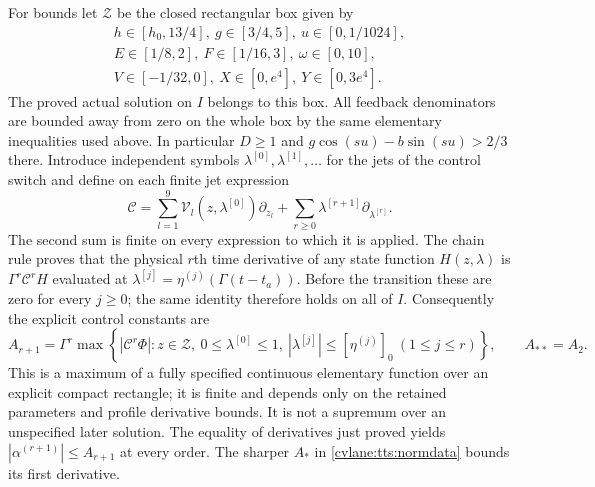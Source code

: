 For bounds let $\mathcal Z$ be the closed rectangular box given
by
\[
 \begin{gathered}
 h\in[h_0,13/4],\ g\in[3/4,5],\ u\in[0,1/1024],\\
 E\in[1/8,2],\ F\in[1/16,3],\ \omega\in[0,10],\\
 V\in[-1/32,0],\ X\in[0,e^4],\ Y\in[0,3e^4].
 \end{gathered}
\]
The proved actual solution on $I$ belongs to this box. All
feedback denominators are bounded away from zero on the whole
box by the same elementary inequalities used above. In particular
$D\geq1$ and $g\cos(su)-b\sin(su)>2/3$ there. Introduce
independent symbols $\lambda^{[0]},\lambda^{[1]},\ldots$ for the jets
of the control switch and define on each finite jet expression
\begin{equation}\label{cvlane:tts:jetderivation}
 \mathcal C=
 \sum_{l=1}^9\mathcal V_l(z,\lambda^{[0]})\partial_{z_l}
             +\sum_{r\geq0}\lambda^{[r+1]}\partial_{\lambda^{[r]}}.
\end{equation}
The second sum is finite on every expression to which it is applied.
The chain rule proves that the physical $r$th time derivative of
any state function $H(z,\lambda)$ is
$\Gamma^r\mathcal C^rH$ evaluated at
$\lambda^{[j]}=\eta^{(j)}(\Gamma(t-t_a))$. Before the transition
these are zero for every $j\geq0$;
the same identity therefore holds on all of $I$.
Consequently the explicit control constants are
\begin{equation}\label{cvlane:tts:controljets}
 A_{r+1}=\Gamma^r
 \max\left\{|\mathcal C^r\Phi|:
 z\in\mathcal Z,\ 0\leq\lambda^{[0]}\leq1,
 \ |\lambda^{[j]}|\leq[\eta^{(j)}]_0\ (1\leq j\leq r)\right\},
 \qquad A_{**}=A_2.
\end{equation}
This is a maximum of a fully specified continuous elementary
function over an explicit compact rectangle; it is finite and
depends only on the retained parameters and profile derivative
bounds. It is not a supremum over an unspecified later solution.
The equality of derivatives just proved yields
$|\alpha^{(r+1)}|\leq A_{r+1}$ at every order. The sharper
$A_*$ in \eqref{cvlane:tts:normdata} bounds its first derivative.

